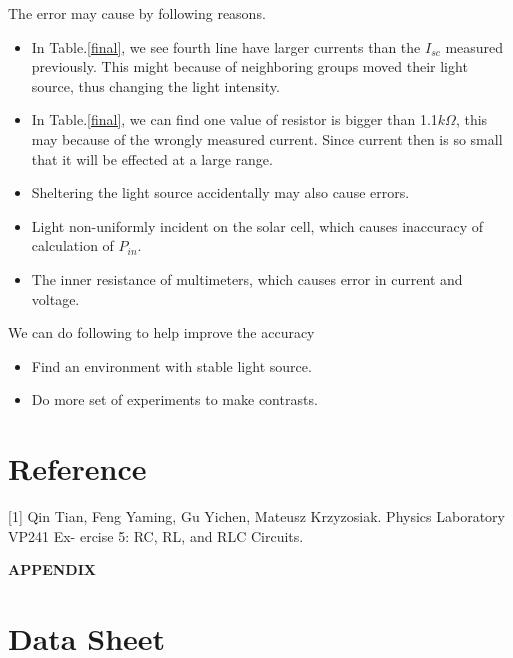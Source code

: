 \documentclass[12pt,a4paper]{article}
\begin{document}
The error may cause by following reasons.
\begin{itemize}
    \item In Table.\ref{final}, we see fourth line have larger currents than the $I_{sc}$ measured previously. This might because of neighboring groups moved their light source, thus changing the light intensity.
    \item In Table.\ref{final}, we can find one value of resistor is bigger than 1.1$k\Omega$, this may because of the wrongly measured current. Since current then is so small that it will be effected at a large range.
    \item Sheltering the light source accidentally may also cause errors.
    \item Light non-uniformly incident on the solar cell, which causes inaccuracy of calculation of $P_{in}$.
    \item The inner resistance of multimeters, which causes error in current and voltage.
\end{itemize}
We can do following to help improve the accuracy
\begin{itemize}
    \item Find an environment with stable light source.
	\item Do more set of experiments to make contrasts.
\end{itemize}


\section{Reference}
[1] Qin Tian, Feng Yaming, Gu Yichen, Mateusz Krzyzosiak. Physics Laboratory VP241 Ex-
ercise 5: RC, RL, and RLC Circuits.


\newpage
{\LARGE\textbf{APPENDIX}}
\setcounter{section}{0}
\renewcommand\thesection{\Alph{section}}
\section{Data Sheet}
\end{document}
